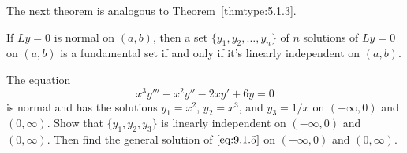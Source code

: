 \documentclass{ximera}
\begin{document}
The next theorem is analogous to
Theorem~\ref{thmtype:5.1.3}.

\begin{theorem}\label{thmtype:9.1.2}
If  $Ly=0$ is normal on $(a,b)$, then a set
$\{y_1,y_2,\dots,y_n\}$ of $n$ solutions of $Ly=0$ on $(a,b)$ is a
fundamental set if and only if it's linearly independent on $(a,b)$.
\end{theorem}

\begin{example}\label{example:9.1.1}
The equation
\begin{equation}\label{eq:9.1.5}
x^3y'''-x^2y''-2xy'+6y=0
\end{equation}
is normal and has the solutions $y_1=x^2$, $y_2=x^3$, and $y_3=1/x$ on
$(-\infty,0)$ and $(0,\infty)$.  Show that $\{y_1,y_2,y_3\}$
is linearly independent on $(-\infty, 0)$ and $(0,\infty)$. Then find
the general solution of $\eqref{eq:9.1.5}$ on $(-\infty, 0)$ and
$(0,\infty)$.



\end{example}
\end{document}
